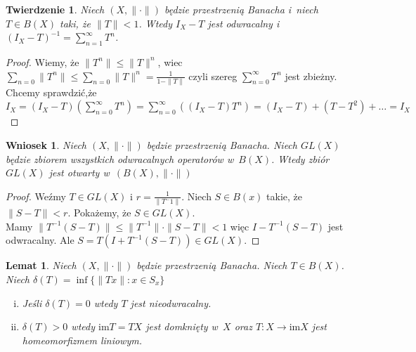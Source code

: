 \documentclass[11pt]{mwrep}
\renewcommand{\[}{\begin{equation}}
\renewcommand{\]}{\end{equation}}
\newcommand{\norm}{\|\cdot\|}
\newcommand{\im}{\mathrm{im}}
\newtheorem{twr}[subsection]{Twierdzenie}%
\newtheorem{lem}[subsection]{Lemat}
\newtheorem{wn}[subsection]{Wniosek}
\newcounter{numer}
\begin{document}
\begin{twr}
	Niech $(X,\norm)$ będzie przestrzenią Banacha i~niech $T\in B(X)$ taki, że $\|T\| <1$. Wtedy $I_X - T$ jest odwracalny i~
	$\left( I_X - T  \right)^{-1} = \sum_{n=1}^\infty T^n$.
\end{twr}
\begin{proof}
	Wiemy, że $\|T^n\|\le \|T\|^n$, wiec $\sum_{n=0}\|T^n\| \le \sum_{n=0} \|T\|^n = \frac{1}{1-\|T\|}$ czyli
	szereg $\sum_{n=0}^\infty T^n$ jest zbieżny. 
	Chcemy sprawdzić,że $I_X=(I_X -T)  \left( \sum_{n=0}^\infty T^n \right)= \sum_{n=0}^\infty \left( (I_X-T) T^n \right)=
	(I_X-T)+(T-T^2)+\ldots=I_X$
\end{proof}
\begin{wn}
	Niech $(X,\norm)$ będzie przestrzenią Banacha. Niech $GL(X)$ będzie zbiorem wszystkich odwracalnych operatorów w~$B(X)$.
	Wtedy zbiór $GL(X)$ jest otwarty w~$(B(X),\norm)$ 
\end{wn}
\begin{proof}
	Weźmy $T\in GL(X)$ i $r= \frac{1}{\|T^-1\|}$. Niech $S\in B(x)$ takie, że$\|S-T\|<r$.
	Pokażemy, że $S \in GL(X)$. \\
	Mamy $\|T^{-1}(S-T)\| \le \|T^{-1}\|\cdot\|S - T\| <1$ więc $I-T^{-1}(S - T)$ jest odwracalny.
	Ale $S= T(I+T^{-1}(S - T ))\in GL(X)$. 
\end{proof}
\begin{lem}
\label{deltalem}
	Niech $(X,\norm)$ będzie przestrzenią Banacha. Niech $T \in B(X)$.
	Niech $\delta(T) = \inf\{ \|Tx\|: x \in S_x\}$ 
	\begin{enumerate}[(i)]
		\item Jeśli $\delta(T) = 0$ wtedy $T$ jest nieodwracalny.
		\item $\delta(T) >0$ wtedy $\im T =TX$ jest domknięty w~$X$ oraz $T\colon X \to \im X$ jest homeomorfizmem liniowym.
	\end{enumerate}
\end{lem}
\end{document}
